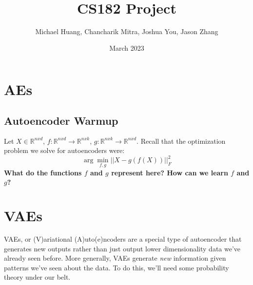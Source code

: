 \documentclass{article}
\title{CS182 Project}
\author{Michael Huang, Chancharik Mitra, Joshua You, Jason Zhang}
\date{March 2023}
\begin{document}
\maketitle

\section{AEs}
\subsection{Autoencoder Warmup}
Let $X \in \mathbb{R}^{nxd}$, $f: \mathbb{R}^{nxd} \to \mathbb{R}^{nxk}$, $g: \mathbb{R}^{nxk} \to \mathbb{R}^{nxd}$. Recall that the optimization problem we solve for autoencoders were:
\begin{equation}
    \arg\min_{f, g} ||X - g(f(X))||_F^2
\end{equation}
\textbf{What do the functions $f$ and $g$ represent here? How can we learn $f$ and $g$?}
\\
\section{VAEs} 
VAEs, or (V)ariational (A)uto(e)ncoders are a special type of autoencoder that generates new outputs rather than just output lower dimensionality data we've already seen before. More generally, VAEs generate \textit{new} information given patterns we've seen about the data. To do this, we'll need some probability theory under our belt.
\end{document}

